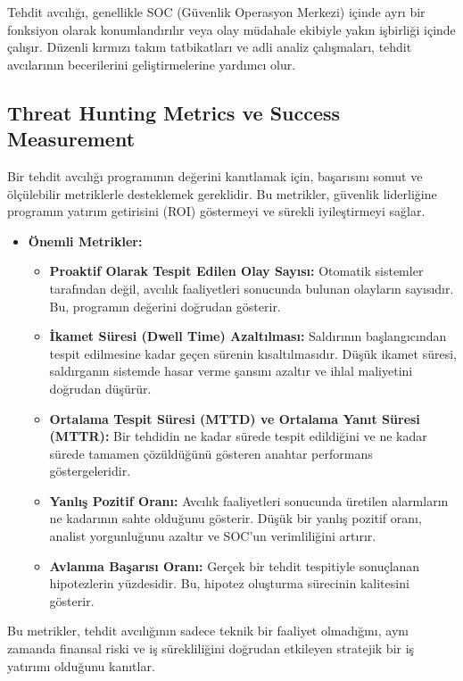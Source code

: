 Tehdit avcılığı, genellikle SOC (Güvenlik Operasyon Merkezi) içinde ayrı bir fonksiyon olarak konumlandırılır veya olay müdahale ekibiyle yakın işbirliği içinde çalışır. Düzenli kırmızı takım tatbikatları ve adli analiz çalışmaları, tehdit avcılarının becerilerini geliştirmelerine yardımcı olur.

\subsection{Threat Hunting Metrics ve Success Measurement}

Bir tehdit avcılığı programının değerini kanıtlamak için, başarısını somut ve ölçülebilir metriklerle desteklemek gereklidir. Bu metrikler, güvenlik liderliğine programın yatırım getirisini (ROI) göstermeyi ve sürekli iyileştirmeyi sağlar.

\begin{itemize}
    \item \textbf{Önemli Metrikler:}
    \begin{itemize}
        \item \textbf{Proaktif Olarak Tespit Edilen Olay Sayısı:} Otomatik sistemler tarafından değil, avcılık faaliyetleri sonucunda bulunan olayların sayısıdır. Bu, programın değerini doğrudan gösterir.
        \item \textbf{İkamet Süresi (Dwell Time) Azaltılması:} Saldırının başlangıcından tespit edilmesine kadar geçen sürenin kısaltılmasıdır. Düşük ikamet süresi, saldırganın sistemde hasar verme şansını azaltır ve ihlal maliyetini doğrudan düşürür.
        \item \textbf{Ortalama Tespit Süresi (MTTD) ve Ortalama Yanıt Süresi (MTTR):} Bir tehdidin ne kadar sürede tespit edildiğini ve ne kadar sürede tamamen çözüldüğünü gösteren anahtar performans göstergeleridir.
        \item \textbf{Yanlış Pozitif Oranı:} Avcılık faaliyetleri sonucunda üretilen alarmların ne kadarının sahte olduğunu gösterir. Düşük bir yanlış pozitif oranı, analist yorgunluğunu azaltır ve SOC'un verimliliğini artırır.
        \item \textbf{Avlanma Başarısı Oranı:} Gerçek bir tehdit tespitiyle sonuçlanan hipotezlerin yüzdesidir. Bu, hipotez oluşturma sürecinin kalitesini gösterir.
    \end{itemize}
\end{itemize}

Bu metrikler, tehdit avcılığının sadece teknik bir faaliyet olmadığını, aynı zamanda finansal riski ve iş sürekliliğini doğrudan etkileyen stratejik bir iş yatırımı olduğunu kanıtlar.

